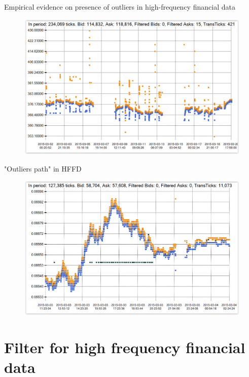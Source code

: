 \documentclass{beamer}
\begin{document}
\begin{frame}{Empirical evidence on presence of outliers in high-frequency financial data}

\begin{figure}
    \centering
    \includegraphics[width=1\textwidth]{../wykresy/fsgj15.PNG}
\end{figure}

\end{frame}


\begin{frame}{"Outliers path" in HFFD}
    
\begin{figure}
    \centering
    \includegraphics[width=1\textwidth]{../wykresy/f6mh15.PNG}
\end{figure}

\end{frame}

\section{Filter for high frequency financial data}
\end{document}
